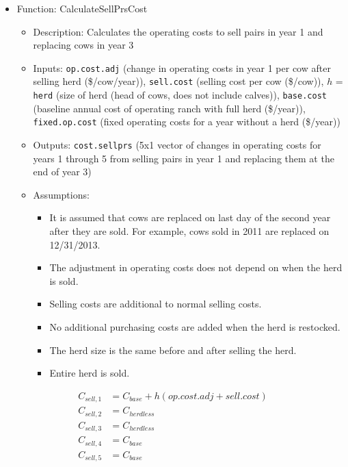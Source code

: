 \documentclass[11pt]{article}
\begin{document}
\begin{itemize}
\item Function: CalculateSellPrsCost
	\begin{itemize}
	\item Description: Calculates the operating costs to sell pairs in year 1 and replacing cows in year 3
	\item Inputs: \verb!op.cost.adj! (change in operating costs in year 1 per cow after selling herd (\$/cow/year)), \verb!sell.cost! (selling cost per cow (\$/cow)), $h$ = \verb!herd! (size of herd (head of cows, does not include calves)), \verb!base.cost! (baseline annual cost of operating ranch with full herd (\$/year)), \verb!fixed.op.cost! (fixed operating costs for a year without a herd (\$/year))
	\item Outputs: \verb!cost.sellprs! (5x1 vector of changes in operating costs for years 1 through 5 from selling pairs in year 1 and replacing them at the end of year 3)
  	\item Assumptions: 
  		\begin{itemize}
  		\item It is assumed that cows are replaced on last day of the second year after they are sold. For example, cows sold in 2011 are replaced on 12/31/2013. 
  		\item The adjustment in operating costs does not depend on when the herd is sold. 
  		\item Selling costs are additional to normal selling costs. 
  		\item No additional purchasing costs are added when the herd is restocked.
  		\item The herd size is the same before and after selling the herd.
  		\item Entire herd is sold.
  		\end{itemize}
	\end{itemize}
\end{itemize}

\begin{align*}
C_{sell, 1} &= C_{base} + h (op.cost.adj + sell.cost) \\
C_{sell, 2} &= C_{herdless} \\
C_{sell, 3} &= C_{herdless} \\
C_{sell, 4} &= C_{base} \\
C_{sell, 5} &= C_{base}
\end{align*}
\end{document}
